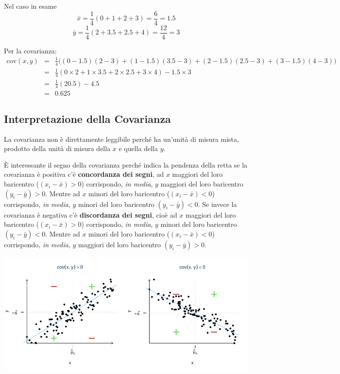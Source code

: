 \documentclass[
  11pt,
]{book}
\theoremstyle{mytheoremstyle}
\theoremstyle{mydefstyle}
\begin{document}
Nel caso in esame
\[\bar x=\frac 1 4(0+1+2+3)=\frac{6}{4}=1.5\]
\[\bar y=\frac 1 4(2+3.5+2.5+4)=\frac{12}{4}=3\]

Per la covarianza:
\begin{eqnarray*}
\text{cov}(x,y)&=&\frac 1 4\Big(( 0-1.5 ) ( 2-3 )+( 1-1.5 ) ( 3.5-3 )+( 2-1.5 ) ( 2.5-3 )+( 3-1.5 ) ( 4-3 )\Big)\\
&=& \frac 1 4(0 \times 2+1 \times 3.5+2 \times 2.5+3 \times 4)-1.5\times3\\
&=& \frac 1 4(20.5)-4.5\\
&=& 0.625
\end{eqnarray*}

\subsection{Interpretazione della Covarianza}\label{interpretazione-della-covarianza}

La covarianza non è direttamente leggibile perché ha un'unità di misura mista,
prodotto della unità di misura della \(x\) e quella della \(y\).

È interessante il segno della covarianza perché indica la pendenza della retta se la covarianza è positiva c'è \textbf{concordanza dei segni}, ad \(x\) maggiori del loro baricentro (\((x_i-\bar x)>0\)) corrispondo, \emph{in media}, \(y\) maggiori del loro baricentro \((y_i-\bar y)>0\). Mentre ad \(x\) minori del loro baricentro (\((x_i-\bar x)<0\)) corrispondo, \emph{in media}, \(y\) minori del loro baricentro \((y_i-\bar y)<0\). Se invece la covarianza è negativa c'è \textbf{discordanza dei segni}, cioè ad \(x\) maggiori del loro baricentro (\((x_i-\bar x)>0\)) corrispondo, \emph{in media}, \(y\) minori del loro baricentro \((y_i-\bar y)<0\). Mentre ad \(x\) minori del loro baricentro (\((x_i-\bar x)<0\)) corrispondo, \emph{in media}, \(y\) maggiori del loro baricentro \((y_i-\bar y)>0\).

\begin{center}\includegraphics{Appunti_di_Statistica_2025_files/figure-latex/17-regressione-I-34-1} \end{center}
\end{document}
